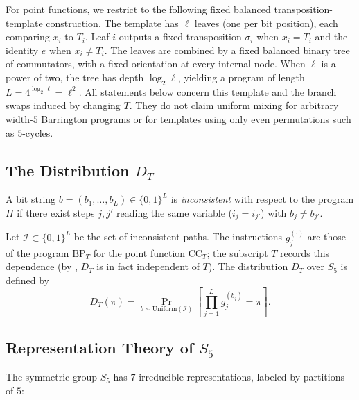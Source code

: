 \documentclass[version=final]{iacrcc}
\newcommand{\CC}{\mathrm{CC}}
\newcommand{\BP}{\mathrm{BP}}
\begin{document}
For point functions, we restrict to the following fixed balanced
transposition-template construction. The template has $\ell$ leaves (one per bit
position), each comparing $x_i$ to $T_i$. Leaf $i$ outputs a fixed transposition
$\sigma_i$ when $x_i = T_i$ and the identity $e$ when $x_i \neq T_i$. The leaves
are combined by a fixed balanced binary tree of commutators, with a fixed
orientation at every internal node. When $\ell$ is a power of two, the tree has
depth $\log_2 \ell$, yielding a program of length $L = 4^{\log_2 \ell}=\ell^2$.
All statements below concern this template and the branch swaps induced by
changing $T$. They do not claim uniform mixing for arbitrary width-$5$
Barrington programs or for templates using only even permutations such as
$5$-cycles.


\subsection{\texorpdfstring{The Distribution $D_T$}{The Distribution D\_T}}

\begin{definition}
A bit string $b = (b_1, \ldots, b_L) \in \{0,1\}^L$ is \emph{inconsistent}
with respect to the program $\Pi$ if there exist steps $j, j'$ reading the
same variable ($i_j = i_{j'}$) with $b_j \neq b_{j'}$.
\end{definition}

\begin{definition}[$D_T$]
Let $\mathcal{I} \subset \{0,1\}^L$ be the set of inconsistent paths.
The instructions $g_j^{(\cdot)}$ are those of the program $\BP_T$ for the point
function $\CC_T$; the subscript $T$ records this dependence (by
, $D_T$ is in fact independent of $T$).
The distribution $D_T$ over $S_5$ is defined by
\[
D_T(\pi) = \Pr_{b \sim \mathrm{Uniform}(\mathcal{I})}
\left[ \prod_{j=1}^{L} g_j^{(b_j)} = \pi \right].
\]
\end{definition}


\subsection{\texorpdfstring{Representation Theory of $S_5$}{Representation Theory of S5}}

The symmetric group $S_5$ has $7$ irreducible representations, labeled by
partitions of $5$:
\end{document}
